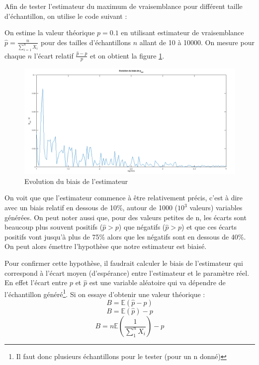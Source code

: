 \documentclass[12pt,a4paper,titlepage]{article}
\numberwithin{equation}{section}
\begin{document}
Afin de tester l'estimateur du maximum de vraisemblance pour différent taille
d'échantillon, on utilise le code suivant :



On estime la valeur théorique $p=0.1$ en utilisant
estimateur de vraisemblance $\hat{p} = \frac{n}{\sum\limits_{i=1}^{n}X_i}$ pour des tailles d'échantillons $n$ allant de 10 à 10000.
On mesure pour chaque $n$ l'écart relatif $\frac{\hat{p}-p}{p}$ et on obtient la figure \ref{Evolution du biais de l'estimateur geom}.

\begin{figure}[!h]
\begin{center}
 \includegraphics[scale=0.3]{images/biaisGeom.png} 
\end{center}
 \caption{Evolution du biais de l'estimateur}
 \label{Evolution du biais de l'estimateur geom}
\end{figure}

On voit que que l'estimateur commence à être relativement précis, c'est à dire avec un biais relatif en dessous de 10\%, autour de 1000 ($10^3$ valeurs) variables générées. On peut noter aussi que, pour des valeurs petites de n, les écarts sont beaucoup plus souvent positifs ($\hat{p}>p$) que négatifs ($\hat{p}>p$) et que ces écarts positifs vont jusqu'à plus de 75\% alors que les négatifs sont en dessous de 40\%. On peut alors émettre l'hypothèse que notre estimateur est biaisé. 

Pour confirmer cette hypothèse, il faudrait calculer le biais de l'estimateur qui correspond à l'écart moyen (d'espérance) entre l'estimateur et le paramètre réel. En effet l'écart entre $p$ et $\hat{p}$ est une variable aléatoire qui va dépendre de l'échantillon généré\footnote{Il faut donc plusieurs échantillons pour le tester (pour un n donné)}. Si on essaye d'obtenir une valeur théorique :
\[B=\mathbb{E}(\hat{p} - p)\]
\[B=\mathbb{E}(\hat{p}) - p\]
\[B=n\mathbb{E}\left(\frac{1}{\sum\limits_{1}^{n}X_{i}}\right) - p\]
\end{document}
